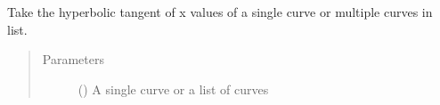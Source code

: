 \documentclass[letterpaper,10pt,english]{sphinxmanual}
\begin{document}
\begin{fulllineitems}
\label{\detokenize{pydv:pydvpy.tanhx}}
Take the hyperbolic tangent of x values of a single curve or multiple curves in list.

\begin{sphinxVerbatim}[commandchars=\\\{\}]
  
\end{sphinxVerbatim}

\begin{sphinxVerbatim}[commandchars=\\\{\}]
\end{sphinxVerbatim}
\begin{quote}\begin{description}
\item[{Parameters}] \leavevmode
{} () \textendash{} A single curve or a list of curves

\end{description}\end{quote}

\end{fulllineitems}

\end{document}
